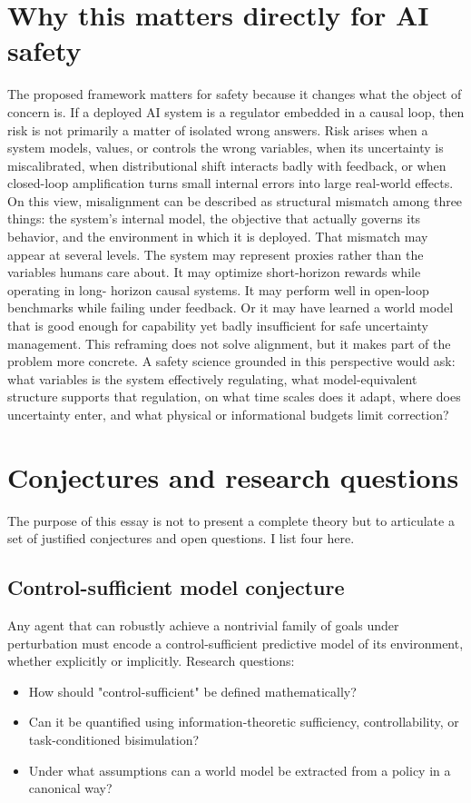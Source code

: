 \documentclass[11pt]{article}
\begin{document}
\section{Why this matters directly for AI safety}
The proposed framework matters for safety because it changes what the object of concern is. If a deployed AI system is a regulator embedded in a causal loop, then risk is not primarily a matter of isolated wrong answers. Risk arises when a system models, values, or controls the wrong variables, when its uncertainty is miscalibrated, when distributional shift interacts badly with feedback, or when closed-loop amplification turns small internal errors into large real-world effects. On this view, misalignment can be described as structural mismatch among three things: the system's internal model, the objective that actually governs its behavior, and the environment in which it is deployed. That mismatch may appear at several levels. The system may represent proxies rather than the variables humans care about. It may optimize short-horizon rewards while operating in long-
horizon causal systems. It may perform well in open-loop benchmarks while failing under feedback. Or it may have learned a world model that is good enough for capability yet badly insufficient for safe uncertainty management. This reframing does not solve alignment, but it makes part of the problem more concrete. A safety science grounded in this perspective would ask: what variables is the system effectively regulating, what model-equivalent structure supports that regulation, on what time scales does it adapt, where does uncertainty enter, and what physical or informational budgets limit correction?
\section{Conjectures and research questions}
The purpose of this essay is not to present a complete theory but to articulate a set of justified conjectures and open questions. I list four here.
\subsection{Control-sufficient model conjecture}
Any agent that can robustly achieve a nontrivial family of goals under perturbation must encode a control-sufficient predictive model of its environment, whether explicitly or implicitly.
Research questions:
\begin{itemize}
\item How should "control-sufficient" be defined mathematically?
\item Can it be quantified using information-theoretic sufficiency, controllability, or task-conditioned bisimulation?
\item Under what assumptions can a world model be extracted from a policy in a canonical way?
\end{itemize}
\end{document}
